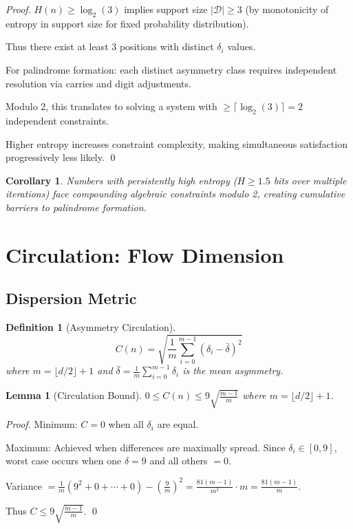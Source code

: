 \documentclass[12pt,a4paper]{article}
\newtheorem{lemma}[theorem]{Lemma}
\newtheorem{definition}[theorem]{Definition}
\newtheorem{corollary}[theorem]{Corollary}
\begin{document}
\begin{proof}
$H(n) \geq \log_2(3)$ implies support size $|\mathcal{D}| \geq 3$ (by monotonicity of entropy in support size for fixed probability distribution).

Thus there exist at least 3 positions with distinct $\delta_i$ values.

For palindrome formation: each distinct asymmetry class requires independent resolution via carries and digit adjustments.

Modulo 2, this translates to solving a system with $\geq \lceil \log_2(3) \rceil = 2$ independent constraints.

Higher entropy increases constraint complexity, making simultaneous satisfaction progressively less likely. \qed
\end{proof}

\begin{corollary}
Numbers with persistently high entropy ($H \geq 1.5$ bits over multiple iterations) face compounding algebraic constraints modulo 2, creating cumulative barriers to palindrome formation.
\end{corollary}

\section{Circulation: Flow Dimension}

\subsection{Dispersion Metric}

\begin{definition}[Asymmetry Circulation]
$$C(n) = \sqrt{\frac{1}{m}\sum_{i=0}^{m-1} (\delta_i - \bar{\delta})^2}$$
where $m = \lfloor d/2 \rfloor + 1$ and $\bar{\delta} = \frac{1}{m}\sum_{i=0}^{m-1} \delta_i$ is the mean asymmetry.
\end{definition}

\begin{lemma}[Circulation Bound]\label{lem:circ_bound}
$0 \leq C(n) \leq 9\sqrt{\frac{m-1}{m}}$ where $m = \lfloor d/2 \rfloor + 1$.
\end{lemma}

\begin{proof}
Minimum: $C = 0$ when all $\delta_i$ are equal.

Maximum: Achieved when differences are maximally spread. Since $\delta_i \in [0,9]$, worst case occurs when one $\delta = 9$ and all others $= 0$.

Variance $= \frac{1}{m}(9^2 + 0 + \cdots + 0) - \left(\frac{9}{m}\right)^2 = \frac{81(m-1)}{m^2} \cdot m = \frac{81(m-1)}{m}$.

Thus $C \leq 9\sqrt{\frac{m-1}{m}}$. \qed
\end{proof}
\end{document}
